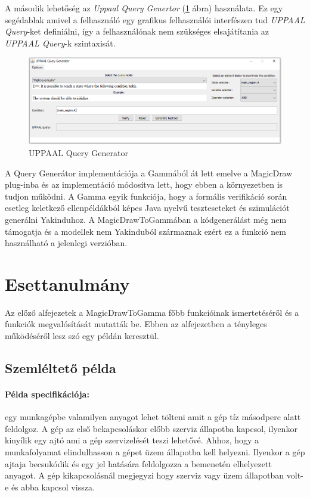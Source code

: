 A második lehetőség az \emph{Uppaal Query Genertor} (\ref{fig:upp-query-gen} ábra) használata. Ez egy segédablak amivel a felhasználó egy grafikus felhasználói interfészen tud \emph{UPPAAL Query}-ket definiálni, így a felhasználónak nem szükséges elsajátítania az \emph{UPPAAL Query}-k szintaxisát.

\begin{figure}[!ht]
	\centering
	\includegraphics[keepaspectratio, width=150mm]{figures/query-gen.png}
	\caption{UPPAAL Query Generator}
	\label{fig:upp-query-gen}
\end{figure}

A Query Generátor implementációja a Gammából át lett emelve a MagicDraw plug-inba és az implementáció módosítva lett, hogy ebben a környezetben is tudjon működni. A Gamma egyik funkciója, hogy a formális verifikáció során esetleg keletkező ellenpéldákból képes Java nyelvű teszteseteket és szimulációt generálni Yakinduhoz. A MagicDrawToGammában a kódgenerálást még nem támogatja és a modellek nem Yakinduból származnak ezért ez a funkció nem használható a jelenlegi verzióban.

\section{Esettanulmány}

Az előző alfejezetek a MagicDrawToGamma főbb funkcióinak ismertetéséről és a funkciók megvalósítását mutatták be. Ebben az alfejezetben a  tényleges működéséről lesz szó egy példán keresztül.

\subsection{Szemléltető példa}

\paragraph{Példa specifikációja:} egy munkagépbe valamilyen anyagot lehet tölteni amit a gép tíz másodperc alatt feldolgoz. A gép az első bekapcsoláskor előbb szerviz állapotba kapcsol, ilyenkor kinyílik egy ajtó ami a gép szervizelését teszi lehetővé. Ahhoz, hogy a munkafolyamat elindulhasson a gépet üzem állapotba kell helyezni. Ilyenkor a gép ajtaja becsukódik és egy jel hatására feldolgozza a bemenetén elhelyezett anyagot. A gép kikapcsolásnál megjegyzi hogy szerviz vagy üzem állapotban volt-e és abba kapcsol vissza.

